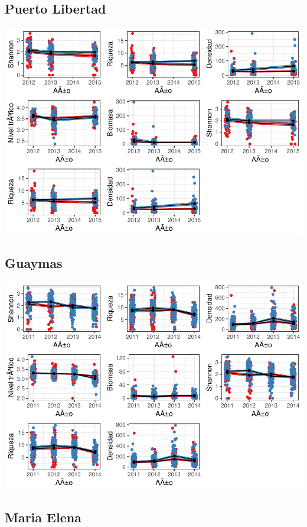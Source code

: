 \documentclass[12pt,]{article}
\begin{document}
\subsection{Puerto Libertad}\label{puerto-libertad}

\includegraphics{Manuscript_files/figure-latex/unnamed-chunk-8-1.pdf}

\subsection{Guaymas}\label{guaymas}

\includegraphics{Manuscript_files/figure-latex/unnamed-chunk-9-1.pdf}

\subsection{Maria Elena}\label{maria-elena}
\end{document}
